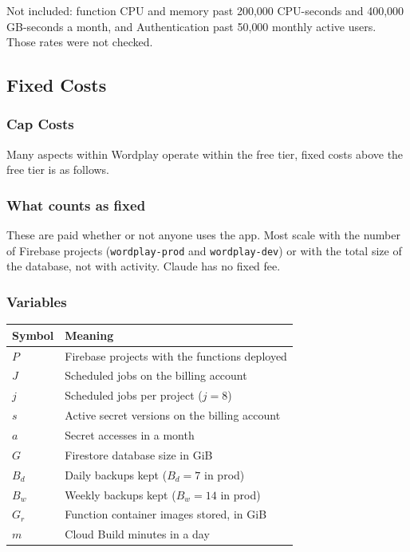 \documentclass{article}
\begin{document}
Not included: function CPU and memory past 200{,}000 CPU-seconds and
400{,}000 GB-seconds a month, and Authentication past 50{,}000 monthly active
users. Those rates were not checked.

\subsection{Fixed Costs}
\subsubsection{Cap Costs}
Many aspects within Wordplay operate within the free tier, fixed costs above the free tier is as follows. 

\subsubsection{What counts as fixed}

These are paid whether or not anyone uses the app. Most scale with the number
of Firebase projects (\texttt{wordplay-prod} and \texttt{wordplay-dev}) or with
the total size of the database, not with activity. Claude has no fixed fee.

\subsubsection{Variables}

\begin{center}
\begin{tabular}{ll}
\toprule
Symbol & Meaning \\
\midrule
$P$ & Firebase projects with the functions deployed \\
$J$ & Scheduled jobs on the billing account \\
$j$ & Scheduled jobs per project ($j = 8$) \\
$s$ & Active secret versions on the billing account \\
$a$ & Secret accesses in a month \\
$G$ & Firestore database size in GiB \\
$B_d$ & Daily backups kept ($B_d = 7$ in prod) \\
$B_w$ & Weekly backups kept ($B_w = 14$ in prod) \\
$G_r$ & Function container images stored, in GiB \\
$m$ & Cloud Build minutes in a day \\
\bottomrule
\end{tabular}
\end{center}
\end{document}
